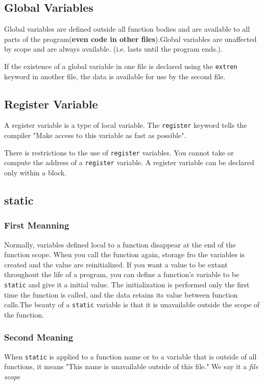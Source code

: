 \documentclass[11pt, a4paper]{book}
\begin{document}
\subsection{Global Variables}
Global variables are defined outside all function bodies and are available to
all  parts of the program(\textbf{even code in other files}).Global variables
are unaffected by scope and are always available. (i.e. lasts until the program
ends.).

If the existence of a global variable in one file is declared using the
\verb|extren| keyword in another file, the data is available for use by the
second file.

\subsection{Register Variable}
A register variable is a type of local variable. The \verb|register| keyword
tells the compiler "Make access to this variable as fast as possible".

There is restrictions to the use of \verb|register| variables. You cannot take
or compute the address of a \verb|register| variable. A register variable can be
declared only within a block.

\subsection{static}
\subsubsection{First Meanning}
Normally, variables defined local to a function disappear at the end of the
function scope. When you call the function again, storage fro the variables is
created and the value are reinitialized. If you want a value to be extant
throughout the life of a program, you can define a function's variable to be
\verb|static| and give it a initial value. The initialization is performed only
the first time the function is called, and the data retains its value between
function calls.The beauty of a \verb|static| variable is that it is unavailable
outside the scope of the function.

\subsubsection{Second Meaning}
When \verb|static| is applied to a function name or to a variable that is
outside of all functions, it means "This name is unavailable outside of this
file." We say it a \emph{file scope}
\end{document}
